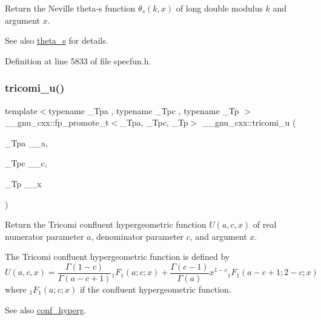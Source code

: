 Return the Neville theta-\/s function $ \theta_s(k,x) $ of {\ttfamily long double} modulus $ k $ and argument $ x $.

\begin{DoxySeeAlso}{See also}
\hyperlink{group__gnu__math__spec__func_gaf28f2dca107531890b49cccf2bdd67be}{theta\+\_\+s} for details. 
\end{DoxySeeAlso}


Definition at line 5833 of file specfun.\+h.

\mbox{\label{group__gnu__math__spec__func_gaf51a13fad85006e4d65c5b117e49f7d8}} 
\subsubsection{\texorpdfstring{tricomi\+\_\+u()}{tricomi\_u()}}
{\footnotesize\ttfamily template$<$typename \+\_\+\+Tpa , typename \+\_\+\+Tpc , typename \+\_\+\+Tp $>$ \\
\+\_\+\+\_\+gnu\+\_\+cxx\+::fp\+\_\+promote\+\_\+t$<$\+\_\+\+Tpa, \+\_\+\+Tpc, \+\_\+\+Tp$>$ \+\_\+\+\_\+gnu\+\_\+cxx\+::tricomi\+\_\+u (\begin{DoxyParamCaption}\item[{\+\_\+\+Tpa}]{\+\_\+\+\_\+a,  }\item[{\+\_\+\+Tpc}]{\+\_\+\+\_\+c,  }\item[{\+\_\+\+Tp}]{\+\_\+\+\_\+x }\end{DoxyParamCaption})\hspace{0.3cm}{\ttfamily [inline]}}

Return the Tricomi confluent hypergeometric function $ U(a,c,x) $ of real numerator parameter $ a $, denominator parameter $ c $, and argument $ x $.

The Tricomi confluent hypergeometric function is defined by \[ U(a,c,x) = \frac{\Gamma(1-c)}{\Gamma(a-c+1)} {}_1F_1(a;c;x) + \frac{\Gamma(c-1)}{\Gamma(a)} x^{1-c} {}_1F_1(a-c+1;2-c;x) \] where $ {}_1F_1(a;c;x) $ if the confluent hypergeometric function.

\begin{DoxySeeAlso}{See also}
\hyperlink{group__gnu__math__spec__func_ga4d01e85e7d295afca5d9f8b6c68f19cc}{conf\+\_\+hyperg}.
\end{DoxySeeAlso}

